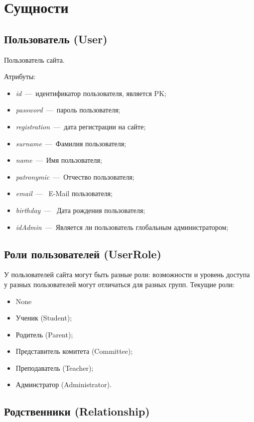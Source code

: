 \documentclass[14pt]{article}
\begin{document}
\section{Сущности}

\subsection{Пользователь (User)}

Пользователь сайта. 

Атрибуты:

\begin{itemize}
	\item \emph{id}~---~идентификатор пользователя, является PK;
	\item \emph{password}~---~пароль пользователя;
	\item \emph{registration}~---~дата регистрации на сайте;
	\item \emph{surname}~---~Фамилия пользователя;
	\item \emph{name}~---~Имя пользователя;
	\item \emph{patronymic}~---~Отчество пользователя;
	\item \emph{email}~---~ E-Mail пользователя;
	\item \emph{birthday}~---~ Дата рождения пользователя;
	\item \emph{idAdmin}~---~Является ли пользователь глобальным администратором;
\end{itemize}

\subsection{Роли пользователей (UserRole)}

У пользователей сайта могут быть разные роли: возможности и уровень доступа у разных пользователей могут отличаться для разных групп.
Текущие роли:
\begin{itemize}
    \item None
	\item Ученик (Student);
	\item Родитель (Parent);
	\item Представитель комитета (Committee);
	\item Преподаватель (Teacher);
	\item Админстратор (Administrator).
\end{itemize}

\subsection{Родственники (Relationship)}
\end{document}
